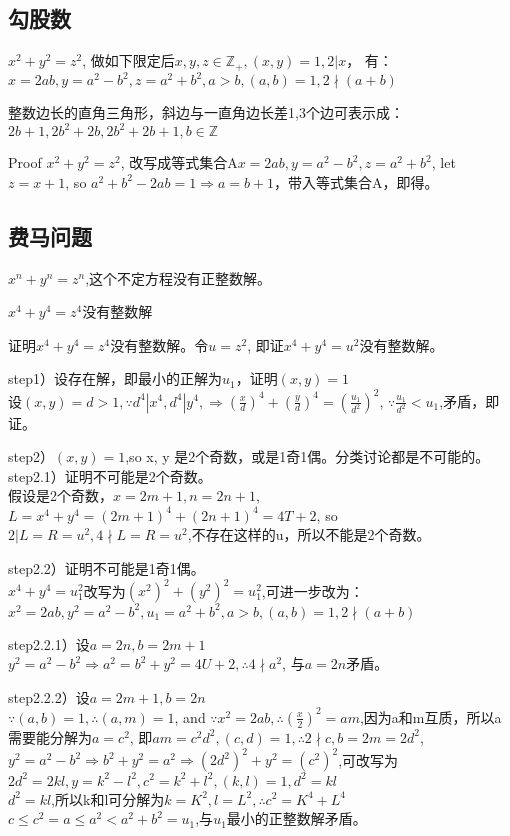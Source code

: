 \documentclass[UTF8]{../09-Mathematics}
\begin{document}
\subsection{勾股数}

$ x^2 + y^2 = z^2$, 做如下限定后$x,y,z \in \mathbb Z_+, (x,y) = 1, 2|x$， 有：$x = 2ab, y = a^2-b^2, z = a^2 + b^2, a>b, (a,b) = 1, 2\nmid (a+b)$


\begin{proposition}
    整数边长的直角三角形，斜边与一直角边长差1,3个边可表示成：$ 2b+1, 2b^2+2b, 2b^2+2b+1, b \in \mathbb Z$

    Proof $x^2 + y^2 = z^2$, 改写成等式集合A$x = 2ab, y = a^2-b^2, z = a^2 + b^2$, let $z= x+1$, so $a^2 + b^2 -2ab = 1\Rightarrow a=b+1$，带入等式集合A，即得。
\end{proposition}

\subsection{费马问题}
$ x^n + y^n = z^n$,这个不定方程没有正整数解。


\begin{proposition}
    $x^4 + y^4 = z^4$没有整数解
\end{proposition}
证明$x^4 + y^4 = z^4$没有整数解。令$u = z^2$, 即证$x^4 + y^4 = u^2$没有整数解。

step1）设存在解，即最小的正解为$u_1$，证明$(x,y) = 1$\\
设$(x,y) =d> 1, \because d^4|x^4, d^4|y^4, \Rightarrow (\frac{x}{d})^4+(\frac{y}{d})^4=(\frac{u_1}{d^2})^2 $, $ \because \frac{u_1}{d^2} < u_1$,矛盾，即证。

step2）$(x,y) = 1$,so x, y 是2个奇数，或是1奇1偶。分类讨论都是不可能的。\\

step2.1）证明不可能是2个奇数。\\
假设是2个奇数，$x = 2m+1, n=2n+1$, $L = x^4 + y^4 = (2m+1)^4 + (2n+1)^4 = 4T+2$, so $2|L= R = u^2, 4\nmid L= R = u^2$,不存在这样的u，所以不能是2个奇数。

step2.2）证明不可能是1奇1偶。\\
$x^4 + y^4 = u_1^2$改写为$(x^2)^2 + (y^2)^2 = u_1^2$,可进一步改为：
$x^2 = 2ab, y^2 = a^2-b^2, u_1 = a^2 + b^2, a>b, (a,b) = 1, 2\nmid (a+b)$

step2.2.1）设$a=2n, b=2m+1$ \\
$y^2 = a^2-b^2 \Rightarrow a^2  = b^2 + y^2 = 4U+2, \therefore 4 \nmid a^2$, 与$a=2n$矛盾。

step2.2.2）设$a=2m+1, b=2n$ \\
$\because (a,b) = 1, \therefore (a,m) = 1$, and $\because x^2 = 2ab,\therefore (\frac{x}{2})^2 = am$,因为a和m互质，所以a需要能分解为$a = c^2$, 即$am = c^2 d^2, (c,d) = 1, \therefore 2 \nmid c, b=2m = 2d^2$, \\
$y^2 = a^2-b^2 \Rightarrow b^2 + y^2 = a^2   \Rightarrow (2d^2)^2 + y^2= (c^2)^2 $,可改写为$2d^2 = 2kl, y=k^2-l^2, c^2 = k^2+l^2, (k,l)=1, d^2 = kl$\\
$d^2 = kl$,所以k和l可分解为$k = K^2, l=L^2, \therefore c^2 = K^4 + L^4$\\
$c \leqslant c^2 = a\leqslant a^2<a^2+b^2 = u_1 $,与$u_1$最小的正整数解矛盾。
\end{document}
